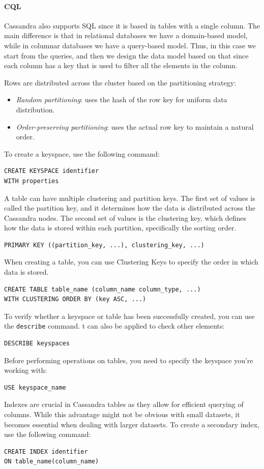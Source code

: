 \paragraph*{CQL}
Cassandra also supports SQL since it is based in tables with a single column.
The main difference is that in relational databases we have a domain-based model, while in columnar databases we have a query-based model. 
Thus, in this case we start from the queries, and then we design the data model based on that since each column has a key that is used to filter all the elements in the column. 

Rows are distributed across the cluster based on the partitioning strategy:
\begin{itemize}
    \item \textit{Random partitioning}: uses the hash of the row key for uniform data distribution.
    \item \textit{Order-preserving partitioning}: uses the actual row key to maintain a natural order.
\end{itemize}
\noindent To create a keyspace, use the following command:
\begin{lstlisting}[style=CQL]
CREATE KEYSPACE identifier 
WITH properties
\end{lstlisting}
A table can have multiple clustering and partition keys. 
The first set of values is called the partition key, and it determines how the data is distributed across the Cassandra nodes. 
The second set of values is the clustering key, which defines how the data is stored within each partition, specifically the sorting order.
\begin{lstlisting}[style=CQL]
PRIMARY KEY ((partition_key, ...), clustering_key, ...)
\end{lstlisting}
When creating a table, you can use Clustering Keys to specify the order in which data is stored.
\begin{lstlisting}[style=CQL]
CREATE TABLE table_name (column_name column_type, ...) 
WITH CLUSTERING ORDER BY (key ASC, ...)
\end{lstlisting}
To verify whether a keyspace or table has been successfully created, you can use the \texttt{describe} command. 
t can also be applied to check other elements:
\begin{lstlisting}[style=CQL]
DESCRIBE keyspaces
\end{lstlisting}
Before performing operations on tables, you need to specify the keyspace you're working with:
\begin{lstlisting}[style=CQL]
USE keyspace_name
\end{lstlisting}
Indexes are crucial in Cassandra tables as they allow for efficient querying of columns. 
While this advantage might not be obvious with small datasets, it becomes essential when dealing with larger datasets.
To create a secondary index, use the following command:
\begin{lstlisting}[style=CQL]
CREATE INDEX identifier
ON table_name(column_name)
\end{lstlisting}